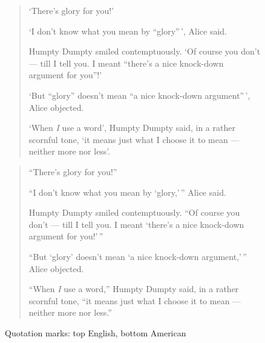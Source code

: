 \begin{figure}
\centering
\begin{minipage}{\textwidth}
\mbox{}\hrulefill\mbox{}
\panunicode
\begin{quotation}
    `There's glory for you!' 

    `I don't know what you mean by ``glory''\,', Alice said. 

    Humpty Dumpty smiled contemptuously. `Of course you don't --- till I tell
you. I meant ``there's a nice knock-down argument for you''!' 

    `But ``glory'' doesn't mean ``a nice knock-down argument''\,', Alice
objected. 

    `When \emph{I} use a word', Humpty Dumpty said, in a rather scornful
tone, `it means just what I choose it to mean --- neither more nor less'.
\end{quotation}
\mbox{}\hrulefill\mbox{}
\begin{quotation}
     \enquote{There's glory for you!} 

    \enquote{I don't know what you mean by `glory,'\,} Alice said. 

    Humpty Dumpty smiled contemptuously. ``Of course you don't --- till I tell
you. I meant `there's a nice knock-down argument for you!'\,'' 

    ``But `glory' doesn't mean `a nice knock-down argument,'\,'' Alice
objected. 

    ``When \emph{I} use a word,'' Humpty Dumpty said, in a rather scornful
tone, ``it means just what I choose it to mean --- neither more nor less.''
\end{quotation}
\mbox{}\hrulefill\mbox{}
\end{minipage}
\caption{Quotation marks: top English, bottom American}\label{fig:qmarks}
\end{figure}



